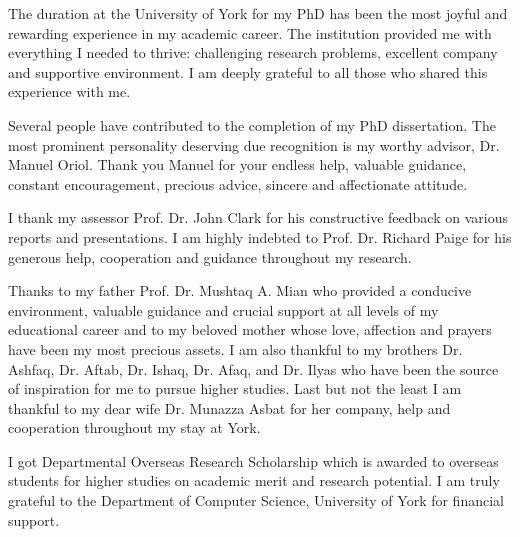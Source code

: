 \begin{acknowledgements}
The duration at the University of York for my PhD has been the most joyful and rewarding experience in my academic career. The institution provided me with everything I needed to thrive: challenging research problems, excellent company and supportive environment. I am deeply grateful to all those who shared this experience with me. 

Several people have contributed to the completion of my PhD dissertation. The most prominent personality deserving due recognition is my worthy advisor, Dr. Manuel Oriol. Thank you Manuel for your endless help, valuable guidance, constant encouragement, precious advice, sincere and affectionate attitude.

I thank my assessor Prof. Dr. John Clark for his constructive feedback on various reports and presentations. I am highly indebted to Prof. Dr. Richard Paige for his generous help, cooperation and guidance throughout my research.

Thanks to my father Prof. Dr. Mushtaq A. Mian who provided a conducive environment, valuable guidance and crucial support at all levels of my educational career and to my beloved mother whose love, affection and prayers have been my most precious assets. I am also thankful to my brothers Dr. Ashfaq, Dr. Aftab, Dr. Ishaq, Dr. Afaq, and Dr. Ilyas who have been the source of inspiration for me to pursue higher studies. Last but not the least I am thankful to my dear wife Dr. Munazza Asbat for her company, help and cooperation throughout my stay at York.

I got Departmental Overseas Research Scholarship which is awarded to overseas students for higher studies on academic merit and research potential. I am truly grateful to the Department of Computer Science, University of York for financial support. 

\end{acknowledgements}